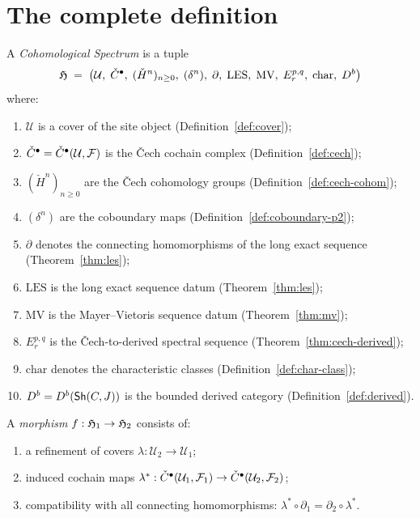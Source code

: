 \section{The complete definition}

\begin{definition}
\label{def:cspec}
A \emph{Cohomological Spectrum} is a tuple
\[
  \mathfrak{H} \;=\;
  \bigl(\mathcal{U},\; \check{C}^\bullet,\;
  (\check{H}^n)_{n \geq 0},\; (\delta^n),\;
  \partial,\; \mathrm{LES},\; \mathrm{MV},\;
  E_r^{p,q},\; \mathrm{char},\; D^b\bigr)
\]
where:
\begin{enumerate}[label=(\roman*),nosep]
\item $\mathcal{U}$ is a cover of the site object
  (Definition~\ref{def:cover});
\item $\check{C}^\bullet = \check{C}^\bullet(\mathcal{U}, \mathcal{F})$ is the
  \v{C}ech cochain complex (Definition~\ref{def:cech});
\item $(\check{H}^n)_{n \geq 0}$ are the \v{C}ech cohomology groups
  (Definition~\ref{def:cech-cohom});
\item $(\delta^n)$ are the coboundary maps
  (Definition~\ref{def:coboundary-p2});
\item $\partial$ denotes the connecting homomorphisms of the long exact
  sequence (Theorem~\ref{thm:les});
\item $\mathrm{LES}$ is the long exact sequence datum
  (Theorem~\ref{thm:les});
\item $\mathrm{MV}$ is the Mayer--Vietoris sequence datum
  (Theorem~\ref{thm:mv});
\item $E_r^{p,q}$ is the \v{C}ech-to-derived spectral sequence
  (Theorem~\ref{thm:cech-derived});
\item $\mathrm{char}$ denotes the characteristic classes
  (Definition~\ref{def:char-class});
\item $D^b = D^b(\mathsf{Sh}(C,J))$ is the bounded derived category
  (Definition~\ref{def:derived}).
\end{enumerate}
\end{definition}

\begin{definition}
\label{def:cspec-morph}
A \emph{morphism} $f : \mathfrak{H}_1 \to \mathfrak{H}_2$ consists of:
\begin{enumerate}[label=(\alph*),nosep]
\item a refinement of covers $\lambda : \mathcal{U}_2 \to \mathcal{U}_1$;
\item induced cochain maps
  $\lambda^* : \check{C}^\bullet(\mathcal{U}_1, \mathcal{F}_1) \to
  \check{C}^\bullet(\mathcal{U}_2, \mathcal{F}_2)$;
\item compatibility with all connecting homomorphisms:
  $\lambda^* \circ \partial_1 = \partial_2 \circ \lambda^*$.
\end{enumerate}
\end{definition}

